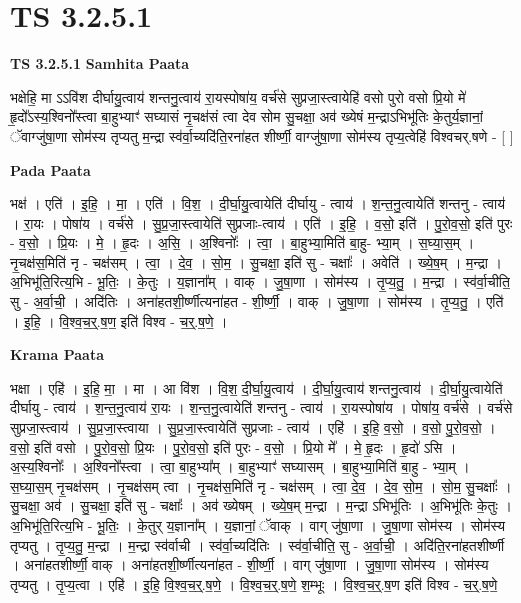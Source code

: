 \documentclass[17pt]{extarticle}
\begin{document}
\section{ TS 3.2.5.1 }

\textbf{TS 3.2.5.1 } \newline
\textbf{Samhita Paata} \newline

भक्षेहि॒ मा ऽऽवि॑श दीर्घायु॒त्वाय॑ शन्तनु॒त्वाय॑ रा॒यस्पोषा॑य॒ वर्च॑से सुप्रजा॒स्त्वायेहि॑ वसो पुरो वसो प्रि॒यो मे॑ हृ॒दो᳚ऽस्य॒श्विनो᳚स्त्वा बा॒हुभ्याꣳ॑ सघ्यासं नृ॒चक्ष॑सं त्वा देव सोम सु॒चक्षा॒ अव॑ ख्येषं म॒न्द्राऽभिभू॑तिः के॒तुर्य॒ज्ञानां॒ ॅवाग्जु॑षा॒णा सोम॑स्य तृप्यतु म॒न्द्रा स्व॑र्वा॒च्यदि॑ति॒रना॑हत शीर्ष्णी॒ वाग्जु॑षा॒णा सोम॑स्य तृप्य॒त्वेहि॑ विश्वचर्.षणे - [  ] \newline

\textbf{Pada Paata} \newline

भक्ष॑ । एति॑ । इ॒हि॒ । मा॒ । एति॑ । वि॒श॒ । दी॒र्घा॒यु॒त्वायेति॑ दीर्घायु - त्वाय॑ । श॒न्त॒नु॒त्वायेति॑ शन्तनु - त्वाय॑ । रा॒यः । पोषा॑य । वर्च॑से । सु॒प्र॒जा॒स्त्वायेति॑ सुप्रजाः-त्वाय॑ । एति॑ । इ॒हि॒ । व॒सो॒ इति॑ । पु॒रो॒व॒सो॒ इति॑ पुरः - व॒सो॒ । प्रि॒यः । मे॒ । हृ॒दः । अ॒सि॒ । अ॒श्विनोः᳚ । त्वा॒ । बा॒हुभ्या॒मिति॑ बा॒हु- भ्या॒म् । स॒घ्या॒स॒म् । नृ॒चक्ष॑स॒मिति॑ नृ - चक्ष॑सम् । त्वा॒ । दे॒व॒ । सो॒म॒ । सु॒चक्षा॒ इति॑ सु - चक्षाः᳚ । अवेति॑ । ख्ये॒ष॒म् । म॒न्द्रा । अ॒भिभू॑ति॒रित्य॒भि - भू॒तिः॒ । के॒तुः । य॒ज्ञाना᳚म् । वाक् । जु॒षा॒णा । सोम॑स्य । तृ॒प्य॒तु॒ । म॒न्द्रा । स्व॑र्वा॒चीति॒ सु - अ॒र्वा॒ची॒ । अदि॑तिः । अना॑हतशी॒र्ष्णीत्यना॑हत - शी॒र्ष्णी॒ । वाक् । जु॒षा॒णा । सोम॑स्य । तृ॒प्य॒तु॒ । एति॑ । इ॒हि॒ । वि॒श्व॒च॒र्॒.ष॒ण॒ इति॑ विश्व - च॒र्॒.ष॒णे॒ ।  \newline


\textbf{Krama Paata} \newline

भक्षा । एहि॑ । इ॒हि॒ मा॒ । मा । आ वि॑श । वि॒श॒ दी॒र्घा॒यु॒त्वाय॑ । दी॒र्घा॒यु॒त्वाय॑ शन्तनु॒त्वाय॑ । दी॒र्घा॒यु॒त्वायेति॑ दीर्घायु - त्वाय॑ । श॒न्त॒नु॒त्वाय॑ रा॒यः । श॒न्त॒नु॒त्वायेति॑ शन्तनु - त्वाय॑ । रा॒यस्पोषा॑य । पोषा॑य॒ वर्च॑से । वर्च॑से सुप्रजा॒स्त्वाय॑ । सु॒प्र॒जा॒स्त्वाया । सु॒प्र॒जा॒स्त्वायेति॑ सुप्रजाः - त्वाय॑ । एहि॑ । इ॒हि॒ व॒सो॒ । व॒सो॒ पु॒रो॒व॒सो॒ । व॒सो॒ इति॑ वसो । पु॒रो॒व॒सो॒ प्रि॒यः । पु॒रो॒व॒सो॒ इति॑ पुरः - व॒सो॒ । प्रि॒यो मे᳚ । मे॒ हृ॒दः । हृ॒दो॑ ऽसि । अ॒स्य॒श्विनोः᳚ । अ॒श्विनो᳚स्त्वा । त्वा॒ बा॒हुभ्या᳚म् । बा॒हुभ्याꣳ॑ सघ्यासम् । बा॒हुभ्या॒मिति॑ बा॒हु - भ्या॒म् । स॒घ्या॒स॒म् नृ॒चक्ष॑सम् । नृ॒चक्ष॑सम् त्वा । नृ॒चक्ष॑स॒मिति॑ नृ - चक्ष॑सम् । त्वा॒ दे॒व॒ । दे॒व॒ सो॒म॒ । सो॒म॒ सु॒चक्षाः᳚ । सु॒चक्षा॒ अव॑ । सु॒चक्षा॒ इति॑ सु - चक्षाः᳚ । अव॑ ख्येषम् । ख्ये॒ष॒म् म॒न्द्रा । म॒न्द्रा ऽभिभू॑तिः । अ॒भिभू॑तिः के॒तुः । अ॒भिभू॑ति॒रित्य॒भि - भू॒तिः॒ । के॒तुर् य॒ज्ञाना᳚म् । य॒ज्ञानां॒ ॅवाक् । वाग् जु॑षा॒णा । जु॒षा॒णा सोम॑स्य । सोम॑स्य तृप्यतु । तृ॒प्य॒तु॒ म॒न्द्रा । म॒न्द्रा स्व॑र्वाची । स्व॑र्वा॒च्यदि॑तिः । स्व॑र्वा॒चीति॒ सु - अ॒र्वा॒ची॒ । अदि॑ति॒रना॑हतशीर्ष्णी । अना॑हतशीर्ष्णी॒ वाक् । अना॑हतशी॒र्ष्णीत्यना॑हत - शी॒र्ष्णी॒ । वाग् जु॑षा॒णा । जु॒षा॒णा सोम॑स्य । सोम॑स्य तृप्यतु । तृ॒प्य॒त्वा । एहि॑ । इ॒हि॒ वि॒श्व॒च॒र्॒.ष॒णे॒ । वि॒श्व॒च॒र्॒.ष॒णे॒ श॒म्भूः । वि॒श्व॒च॒र्॒.ष॒ण इति॑ विश्व - च॒र्॒.ष॒णे॒ \newline
\end{document}
